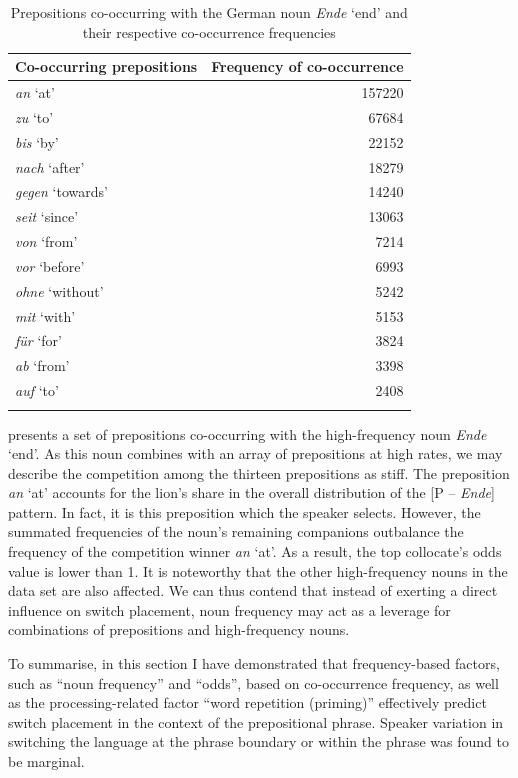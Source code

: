 \begin{table}
	\begin{tabular}{lr}
		\lsptoprule
		Co-occurring prepositions & Frequency of co-occurrence\\\midrule
		\textit{an} `at' & 157220 \\
		\textit{zu} `to' & 67684 \\
		\textit{bis} `by' & 22152 \\
		\textit{nach} `after' & 18279 \\
		\textit{gegen} `towards' & 14240 \\
		\textit{seit} `since' & 13063 \\
		\textit{von} `from' & 7214 \\
		\textit{vor} `before' & 6993 \\
		\textit{ohne} `without' & 5242 \\
		\textit{mit} `with' & 5153 \\
		\textit{für} `for' & 3824 \\
		\textit{ab} `from' & 3398 \\
		\textit{auf} `to' & 2408 \\
		\lspbottomrule
	\end{tabular}
	\caption{Prepositions co-occurring with the German noun \textit{Ende} `end' and their respective co-occurrence frequencies\label{tab:5:6}}
\end{table}


 presents a set of prepositions co-occurring with the high-frequency noun \textit{Ende} `end'. As this noun combines with an array of prepositions at high rates, we may describe the competition among the thirteen prepositions as stiff. The preposition \textit{an} `at' accounts for the lion's share in the overall distribution of the [P -- \textit{Ende}] pattern. In fact, it is this preposition which the speaker selects. However, the summated frequencies of the noun's remaining companions outbalance the frequency of the competition winner \textit{an} `at'. As a result, the top collocate's odds value is lower than 1. It is noteworthy that the other high-frequency nouns in the data set are also affected. We can thus contend that instead of exerting a direct influence on switch placement, noun frequency may act as a leverage for combinations of prepositions and high-frequency nouns.  

To summarise, in this section I have demonstrated that frequency-based factors, such as “noun frequency” and “odds”, based on co-occurrence frequency, as well as the processing-related factor “word repetition (priming)” effectively predict switch placement in the context of the prepositional phrase. Speaker variation in switching the language at the phrase boundary or within the phrase was found to be marginal.

